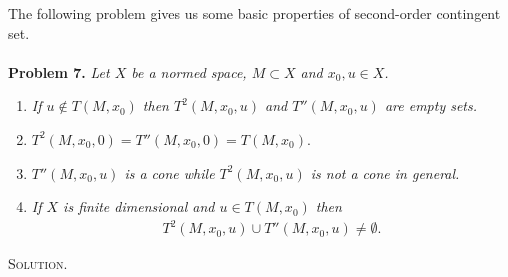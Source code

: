\documentclass[a4paper]{article}
\numberwithin{equation}{section}
\begin{document}
The following problem gives us some basic properties of second-order contingent set.\\
\\
\textbf{Problem 7.} \textit{Let $X$ be a normed space, $M\subset X$ and $x_0,u\in X$.}
\begin{enumerate}
\item \textit{If $u \notin T\left(M,x_0\right)$ then $T^2\left(M,x_0,u\right)$ and $T''\left(M,x_0,u\right)$ are empty sets.}
\item ${T^2}\left( {M,{x_0},0} \right) = T''\left( {M,{x_0},0} \right) = T\left( {M,{x_0}} \right)$.
\item \textit{$T''\left(M,x_0,u\right)$ is a cone while $T^2\left(M,x_0,u\right)$ is not a cone in general.}
\item \textit{If $X$ is finite dimensional and $u\in T\left(M,x_0\right)$ then}
\begin{align}
\label{2.84}
{T^2}\left( {M,{x_0},u} \right) \cup T''\left( {M,{x_0},u} \right) \ne \emptyset .
\end{align}
\end{enumerate}
\textsc{Solution.}
\end{document}
